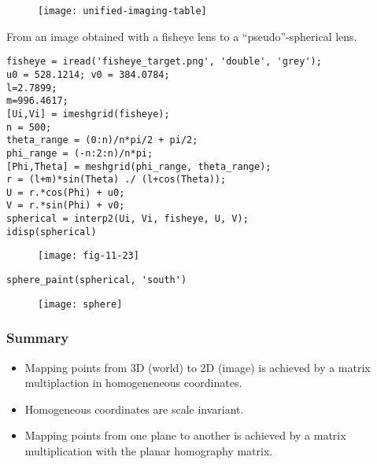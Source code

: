 \begin{frame}
\begin{figure}[!h]
\centering
\texttt{[image: unified-imaging-table]}
\end{figure}
\end{frame}

\begin{frame}[fragile]
From an image obtained with a fisheye lens to a ``pseudo''-spherical lens.
\begin{lstlisting}
fisheye = iread('fisheye_target.png', 'double', 'grey');
u0 = 528.1214; v0 = 384.0784;
l=2.7899;
m=996.4617;
[Ui,Vi] = imeshgrid(fisheye);
n = 500;
theta_range = (0:n)/n*pi/2 + pi/2;
phi_range = (-n:2:n)/n*pi;
[Phi,Theta] = meshgrid(phi_range, theta_range);
r = (l+m)*sin(Theta) ./ (l+cos(Theta));
U = r.*cos(Phi) + u0;
V = r.*sin(Phi) + v0;
spherical = interp2(Ui, Vi, fisheye, U, V);
idisp(spherical)
\end{lstlisting}
\end{frame}

\begin{frame}
\begin{figure}[!h]
\centering
\texttt{[image: fig-11-23]}
\end{figure}
\end{frame}

\begin{frame}[fragile]
\begin{lstlisting}
sphere_paint(spherical, 'south')
\end{lstlisting}
\begin{figure}[!h]
\centering
\texttt{[image: sphere]}
\end{figure}
\end{frame}




\begin{frame}
\frametitle{Summary}
\begin{itemize}
\item Mapping points from 3D (world) to 2D (image) is achieved by a matrix multiplaction in homogeneneous coordinates.
\item Homogeneous coordinates are scale invariant.
\item Mapping points from one plane to another is achieved by a matrix multiplication with the planar homography matrix.
\end{itemize}
\end{frame}

